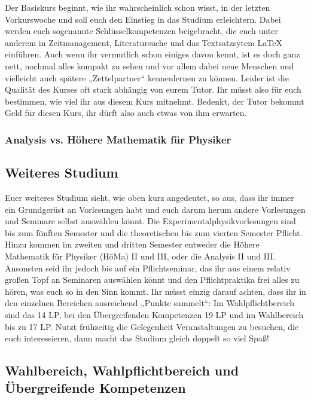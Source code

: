 Der Basiskurs beginnt, wie ihr wahrscheinlich schon wisst, in der letzten Vorkurswoche und soll euch den Einstieg in das Studium erleichtern. Dabei werden euch sogenannte Schlüsselkompetenzen beigebracht, die euch unter anderem in Zeitmanagement, Literatursuche und das Textsatzsytem \LaTeX{} einführen. Auch wenn ihr vermutlich schon einiges davon kennt, ist es doch ganz nett, nochmal alles kompakt zu sehen und vor allem dabei neue Menschen und vielleicht auch spätere „Zettelpartner“ kennenlernen zu können. Leider ist die Qualität des Kurses oft stark abhängig von eurem Tutor. Ihr müsst also für euch bestimmen, wie viel ihr aus diesem Kurs mitnehmt. Bedenkt, der Tutor bekommt Geld für diesen Kurs, ihr dürft also auch etwas von ihm erwarten. %
\subsubsection{Analysis vs. Höhere Mathematik für Physiker}


\subsection{Weiteres Studium}

Euer weiteres Studium sieht, wie oben kurz angedeutet, so aus, dass ihr immer ein Grundgerüst an Vorlesungen habt und euch darum herum andere Vorlesungen und Seminare selbst auswählen könnt. Die Experimentalphysikvorlesungen sind bis zum fünften Semester und die theoretischen bis zum vierten Semester Pflicht. Hinzu kommen im zweiten und dritten Semester entweder die Höhere Mathematik für Physiker (HöMa) II und III, oder die Analysis II und III. Ansonsten seid ihr jedoch bis auf ein Pflichtseminar, das ihr aus einem relativ großen Topf an Seminaren auswählen könnt und den Pflichtpraktika frei alles zu hören, was euch so in den Sinn kommt. Ihr müsst einzig darauf achten, dass ihr in den einzelnen Bereichen ausreichend „Punkte sammelt“: Im Wahlpflichtbereich sind das 14 \gls{LP}, bei den Übergreifenden Kompetenzen 19 \gls{LP} und im Wahlbereich bis zu 17 \gls{LP}. Nutzt frühzeitig die Gelegenheit Veranstaltungen zu besuchen, die euch interessieren, dann macht das Studium gleich doppelt so viel Spaß!

\subsection{Wahlbereich, Wahlpflichtbereich und Übergreifende Kompetenzen}


